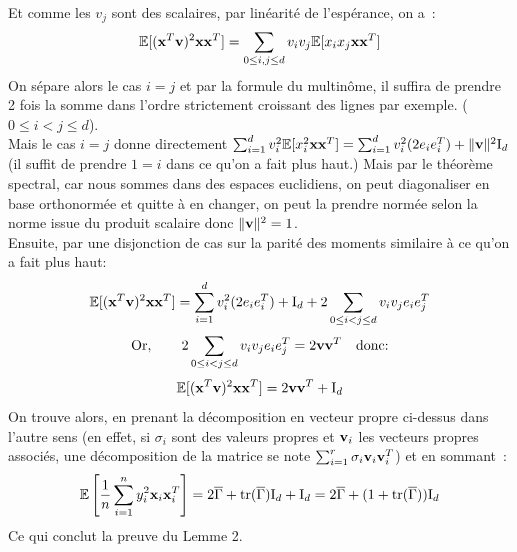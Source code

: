 \documentclass[12pt]{article}
\begin{document}
Et comme les $v_j$ sont des scalaires, par linéarité de l'espérance, on a~:
$$
\mathbb{E}[({\bf x}^T{\bf v})^2{\bf x}{\bf x}^T] = \sum_{0\leq i,j\leq d} v_iv_j \mathbb{E}[x_ix_j{\bf x}{\bf x}^T]
$$
On sépare alors le cas $i=j$ et par la formule du multinôme, il suffira de prendre 2 fois la somme dans l'ordre strictement croissant des lignes par exemple. ($0\leq i < j \leq d$).\\
Mais le cas $i=j$ donne directement $\sum_{i = 1}^dv^2_i \mathbb{E}[x^2_i{\bf x}{\bf x}^T] = \sum_{i = 1}^dv^2_i(2e_ie^T_i)+ \lVert {\bf v} \rVert^2 \text{I}_d$ (il suffit de prendre $1= i$ dans ce qu'on a fait plus haut.) Mais par le théorème spectral, car nous sommes dans des espaces euclidiens, on peut diagonaliser en base orthonormée et quitte à en changer, on peut la prendre normée selon la norme issue du produit scalaire donc $\lVert {\bf v} \rVert^2 = 1$.\\
Ensuite, par une disjonction de cas sur la parité des moments similaire à ce qu'on a fait plus haut:
$$
\mathbb{E}[({\bf x}^T{\bf v})^2{\bf x}{\bf x}^T] = \sum_{i = 1}^dv^2_i(2e_ie^T_i) + \text{I}_d + 2\sum_{0\leq i<j\leq d} v_iv_j e_ie^T_j
$$ 
$$
\text{Or}, \quad \quad 2\sum_{0\leq i<j\leq d} v_iv_j e_ie^T_j = 2{\bf v}{\bf v}^T \quad \text{donc:}
$$
$$
\mathbb{E}[({\bf x}^T{\bf v})^2{\bf x}{\bf x}^T] = 2{\bf v}{\bf v}^T + \text{I}_d 
$$
On trouve alors, en prenant la décomposition en vecteur propre ci-dessus dans l'autre sens (en effet, si $\sigma_i$ sont des valeurs propres et ${\bf v}_i$ les vecteurs propres associés, une décomposition de la matrice se note $\sum_{i=1}^{r} \sigma_i {\bf v}_i{\bf v}^T_i$) et en sommant~:
$$
\mathbb{E}\left[\frac{1}{n} \sum_{i=1}^{n}y^2_i{\bf x}_i{\bf x}^T_i\right] = 2\overline{\Gamma} + \text{tr}{(\overline{\Gamma})}\text{I}_d + \text{I}_d = 2\overline{\Gamma} + (1 + \text{tr}{(\overline{\Gamma})})\text{I}_d
$$
Ce qui conclut la preuve du Lemme 2.
\end{document}
